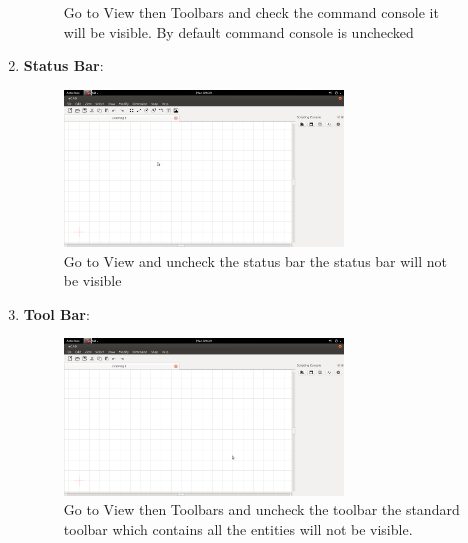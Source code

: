\begin{enumerate}
\begin{figure}[h!]
Go to View then Toolbars and check the command console it will be visible. By default command console is unchecked
\end{figure}
\newpage
\item \textbf{Status Bar}:
\begin{figure}[h!]
\centering
\includegraphics[width=0.7\textwidth]{images/togglestatus.png}\\
Go to View and uncheck the status bar the status bar will not be visible
\end{figure}
\item \textbf{Tool Bar}:
\begin{figure}[h!]
\centering
\includegraphics[width=0.7\textwidth]{images/toggletool.png}\\
Go to View then Toolbars and uncheck the toolbar the standard toolbar which contains all the entities will not be visible.
\end{figure}
\end{enumerate}